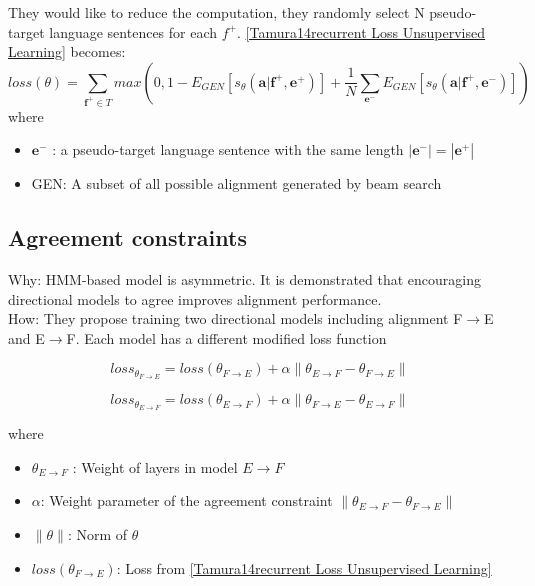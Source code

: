 \documentclass{article}
\begin{document}
They would like to reduce the computation, they randomly select N pseudo-target language sentences for each $f^+$. \eqref{Tamura14recurrent Loss Unsupervised Learning} becomes:
\begin{equation}
loss(\theta) = \sum_{\textbf{f}^+ \in T} max(0 , 1 -  E_{GEN} [s_{\theta} (\textbf{a}|\textbf{f}^+, \textbf{e}^+)]  + \frac{1}{N} \sum_{\textbf{e}^-} E_{GEN} [s_{\theta} (\textbf{a}|\textbf{f}^+, \textbf{e}^-)] )
\end{equation}
where
\begin{itemize}
\item $\textbf{e}^-$ : a pseudo-target language sentence with the same length $|\textbf{e}^-| = |\textbf{e}^+|$
\item GEN: A subset of all possible alignment generated by beam search
\end{itemize}

\subsection{Agreement constraints}

Why: HMM-based model is asymmetric. It is demonstrated that encouraging directional models to agree improves alignment performance.
\\
How: They propose training two directional models including alignment F$\rightarrow$E and E$\rightarrow$F. Each model has a different modified loss function 

\begin{equation}
loss_{\theta_{F \rightarrow E}} = loss(\theta_{F \rightarrow E})  + \alpha \parallel \theta_{E \rightarrow F} - \theta_{F \rightarrow E} \parallel
\end{equation}

\begin{equation}
loss_{\theta_{E \rightarrow F}} = loss(\theta_{E \rightarrow F})  + \alpha \parallel \theta_{F \rightarrow E} - \theta_{E \rightarrow F} \parallel
\end{equation}

where
\begin{itemize}
\item $\theta_{E \rightarrow F}$ : Weight of layers in model $E \rightarrow F$
\item $\alpha$: Weight parameter of the agreement constraint $\parallel \theta_{E \rightarrow F} - \theta_{F \rightarrow E} \parallel$
\item $\parallel \theta \parallel$: Norm of $\theta$
\item $loss(\theta_{F \rightarrow E})$: Loss from \eqref{Tamura14recurrent Loss Unsupervised Learning}
\end{itemize}
\end{document}

